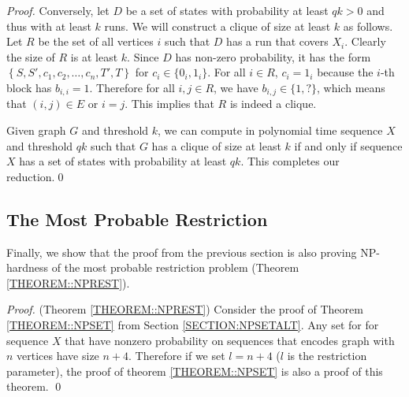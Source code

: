 \begin{proof}
Conversely, let $D$ be a set of states with probability at least $qk>0$
and thus with at least $k$ runs. We will construct a clique of size at least $k$
as follows. Let $R$ be the set of all vertices $i$ such that $D$ has a run that
covers $X_i$. Clearly the size of $R$ is at least $k$.  Since $D$ has non-zero
probability, it has the form $\left\{S,S',c_1,c_2,\dots,c_n,T',T\right\}$ for
$c_i\in \{0_i,1_i\}$. For all $i\in R$, $c_i=1_i$ because the $i$-th block has
$b_{i,i}=1$. Therefore for all $i,j\in R$, we have $b_{i,j}\in \{1,?\}$, which
means that $(i,j)\in E$ or $i=j$. This implies that $R$ is indeed a clique.

Given graph $G$ and threshold $k$, we can compute in
polynomial time sequence $X$ and threshold $qk$ such that $G$ has a
clique of size at least $k$ if and only if sequence $X$ has a
set of states with probability at least $qk$. This completes our reduction.\qed
\end{proof}
\subsection{The Most Probable Restriction}
Finally, we show that the proof from the previous section is also proving NP-hardness of
the most probable restriction problem (Theorem \ref{THEOREM::NPREST}).

\begin{proof}(Theorem \ref{THEOREM::NPREST})
Consider the proof of Theorem \ref{THEOREM::NPSET} from Section
\ref{SECTION:NPSETALT}.
Any set for for sequence $X$ that have nonzero probability on sequences that
encodes graph with $n$ vertices have size $n + 4$. Therefore if we set $l = n +
4$ ($l$ is the restriction parameter), the proof of theorem
\ref{THEOREM::NPSET} is also a proof of this theorem.  \qed
\end{proof}
